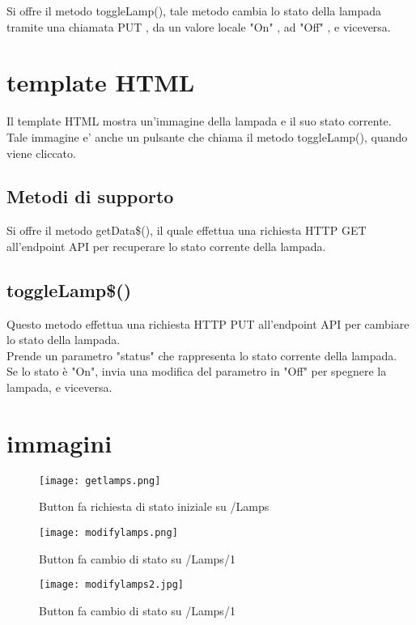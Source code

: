 Si offre il metodo toggleLamp(), tale metodo cambia lo stato della lampada tramite una chiamata PUT , da un valore locale "On" , ad "Off" , e viceversa.

\section{template HTML}
Il template HTML mostra un'immagine della lampada e il suo stato corrente. \\
Tale immagine e' anche un pulsante che chiama il metodo toggleLamp(), quando viene cliccato.

\subsection{Metodi di supporto}
Si offre il metodo getData\$(), il quale effettua una richiesta HTTP GET all'endpoint API per recuperare lo stato corrente della lampada.

\subsection{toggleLamp\$()}
Questo metodo effettua una richiesta HTTP PUT all'endpoint API per cambiare lo stato della lampada. \\
Prende un parametro "status" che rappresenta lo stato corrente della lampada. \\
Se lo stato è "On", invia una modifica del parametro in "Off" per spegnere la lampada, e viceversa.

\section{immagini}

\begin{figure}[H]
    \centering
    \texttt{[image: getlamps.png]}
    \caption{Button fa richiesta di stato iniziale su /Lamps}
\end{figure}


\begin{figure}[H]
    \centering
    \texttt{[image: modifylamps.png]}
    \caption{Button fa cambio di stato su /Lamps/1}
\end{figure}

\begin{figure}[H]
    \centering
    \texttt{[image: modifylamps2.jpg]}
    \caption{Button fa cambio di stato su /Lamps/1}
\end{figure}
